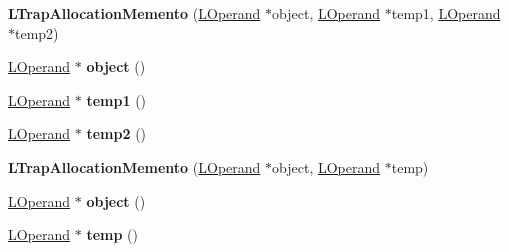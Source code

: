 \begin{DoxyCompactItemize}
\item 
{\bfseries L\+Trap\+Allocation\+Memento} (\hyperlink{classv8_1_1internal_1_1_l_operand}{L\+Operand} $\ast$object, \hyperlink{classv8_1_1internal_1_1_l_operand}{L\+Operand} $\ast$temp1, \hyperlink{classv8_1_1internal_1_1_l_operand}{L\+Operand} $\ast$temp2)\hypertarget{classv8_1_1internal_1_1_l_trap_allocation_memento_af868ce1954e680022b888601b23cfd3c}{}\label{classv8_1_1internal_1_1_l_trap_allocation_memento_af868ce1954e680022b888601b23cfd3c}

\item 
\hyperlink{classv8_1_1internal_1_1_l_operand}{L\+Operand} $\ast$ {\bfseries object} ()\hypertarget{classv8_1_1internal_1_1_l_trap_allocation_memento_a8cf93b74c7f72372724621e5c5cfeb06}{}\label{classv8_1_1internal_1_1_l_trap_allocation_memento_a8cf93b74c7f72372724621e5c5cfeb06}

\item 
\hyperlink{classv8_1_1internal_1_1_l_operand}{L\+Operand} $\ast$ {\bfseries temp1} ()\hypertarget{classv8_1_1internal_1_1_l_trap_allocation_memento_a51d584ab8772f64908e948bc583e89aa}{}\label{classv8_1_1internal_1_1_l_trap_allocation_memento_a51d584ab8772f64908e948bc583e89aa}

\item 
\hyperlink{classv8_1_1internal_1_1_l_operand}{L\+Operand} $\ast$ {\bfseries temp2} ()\hypertarget{classv8_1_1internal_1_1_l_trap_allocation_memento_aeb20addf490cae6ab74bf01d5073a8bd}{}\label{classv8_1_1internal_1_1_l_trap_allocation_memento_aeb20addf490cae6ab74bf01d5073a8bd}

\item 
{\bfseries L\+Trap\+Allocation\+Memento} (\hyperlink{classv8_1_1internal_1_1_l_operand}{L\+Operand} $\ast$object, \hyperlink{classv8_1_1internal_1_1_l_operand}{L\+Operand} $\ast$temp)\hypertarget{classv8_1_1internal_1_1_l_trap_allocation_memento_ac6bcdec1f1e7643e817440c9c13e4a81}{}\label{classv8_1_1internal_1_1_l_trap_allocation_memento_ac6bcdec1f1e7643e817440c9c13e4a81}

\item 
\hyperlink{classv8_1_1internal_1_1_l_operand}{L\+Operand} $\ast$ {\bfseries object} ()\hypertarget{classv8_1_1internal_1_1_l_trap_allocation_memento_a8cf93b74c7f72372724621e5c5cfeb06}{}\label{classv8_1_1internal_1_1_l_trap_allocation_memento_a8cf93b74c7f72372724621e5c5cfeb06}

\item 
\hyperlink{classv8_1_1internal_1_1_l_operand}{L\+Operand} $\ast$ {\bfseries temp} ()\hypertarget{classv8_1_1internal_1_1_l_trap_allocation_memento_ac4ad07a7d7d3bf7ca3285e47cbaed844}{}\label{classv8_1_1internal_1_1_l_trap_allocation_memento_ac4ad07a7d7d3bf7ca3285e47cbaed844}


\end{DoxyCompactItemize}
